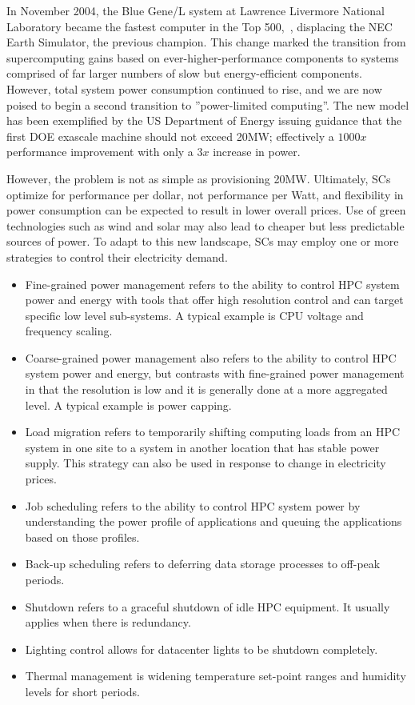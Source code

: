 In November 2004, the Blue Gene/L system at Lawrence Livermore National Laboratory
became the fastest computer in the Top 500,~\cite{FIXME}, displacing the NEC Earth Simulator,
the previous champion.  This change marked the transition from supercomputing gains based
on ever-higher-performance components to systems comprised of far larger numbers of 
slow but energy-efficient components.  However, total system power consumption continued to rise,
and we are now poised to begin a second transition to ''power-limited computing''.  The new
model has been exemplified by the US Department of Energy issuing guidance that the first
DOE exascale machine should not exceed 20MW; effectively a $1000x$ performance improvement
with only a $3x$ increase in power.  

However, the problem is not as simple as provisioning 20MW.  Ultimately, SCs optimize for
performance per dollar, not performance per Watt, and flexibility in power consumption
can be expected to result in lower overall prices.  Use of green technologies such as
wind and solar may also lead to cheaper but less predictable sources of power.
To adapt to this new landscape, SCs may employ one or more strategies to control their 
electricity demand.

\begin{itemize}
\item Fine-grained power management refers to the ability to control HPC system power 
and energy with tools that offer high resolution control and can target specific 
low level sub-systems. A typical example is CPU voltage and frequency scaling.

\item Coarse-grained power management also refers to the ability to control HPC 
system power and energy, but contrasts with fine-grained power management in 
that the resolution is low and it is generally done at a more aggregated level. 
A typical example is power capping.

\item Load migration refers to temporarily shifting computing loads from 
an HPC system in one site to a system in another location that has stable power supply. 
This strategy can also be used in response to change in electricity prices.

\item Job scheduling refers to the ability to control HPC system power 
by understanding the power profile of applications and queuing the 
applications based on those profiles.

\item Back-up scheduling refers to deferring data storage processes to off-peak periods.

\item Shutdown refers to a graceful shutdown of idle HPC equipment. It usually 
applies when there is redundancy.

\item Lighting control allows for datacenter lights to be shutdown completely.

\item Thermal management is widening temperature set-point ranges and 
humidity levels for short periods.
\end{itemize}

